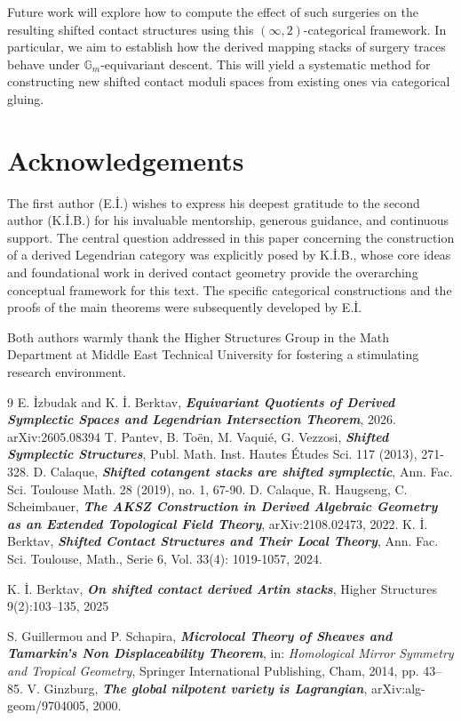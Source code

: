 \documentclass[reqno]{amsart}
\newcommand{\bfem}[1]{\textbf{\textit{#1}}}
\newcommand{\Gm}{\mathbb{G}_m}
\begin{document}
Future work will explore how to compute the effect of such surgeries on the resulting shifted contact structures using this $(\infty, 2)$-categorical framework. In particular, we aim to establish how the derived mapping stacks of surgery traces behave under $\Gm$-equivariant descent. This will yield a systematic method for constructing new shifted contact moduli spaces from existing ones via categorical gluing.

\section*{Acknowledgements}
The first author (E.\.{I}.) wishes to express his deepest gratitude to the second author (K.\.{I}.B.) for his invaluable mentorship, generous guidance, and continuous support. The central question addressed in this paper concerning the construction of a derived Legendrian category was explicitly posed by K.\.{I}.B., whose core ideas and foundational work in derived contact geometry provide the overarching conceptual framework for this text. The specific categorical constructions and the proofs of the main theorems were subsequently developed by E.\.{I}. 

Both authors warmly thank the Higher Structures Group in the Math  Department at Middle East Technical University for fostering a stimulating research environment.

\begin{thebibliography}{9}
 E. \.{I}zbudak and K. \.{I}. Berktav, \bfem{Equivariant Quotients of Derived Symplectic Spaces and Legendrian Intersection Theorem}, 2026.      arXiv:2605.08394
 T. Pantev, B. To\"{e}n, M. Vaqui\'{e}, G. Vezzosi, \bfem{Shifted Symplectic Structures}, Publ. Math. Inst. Hautes \'{E}tudes Sci. 117 (2013), 271-328.
 D. Calaque, \bfem{Shifted cotangent stacks are shifted symplectic}, Ann. Fac. Sci. Toulouse Math. 28 (2019), no. 1, 67-90.
 D. Calaque, R. Haugseng, C. Scheimbauer, \bfem{The AKSZ Construction in Derived Algebraic Geometry as an Extended Topological Field Theory}, arXiv:2108.02473, 2022.
  K. \.{I}. Berktav,
  \bfem{Shifted Contact Structures and Their Local Theory}, Ann. Fac.
  Sci. Toulouse, Math., Serie 6, Vol. 33(4): 1019-1057, 2024.

  K. \.{I}. Berktav,
  \bfem{On shifted contact derived Artin stacks},
  Higher Structures 9(2):103--135, 2025

S. Guillermou and P. Schapira, \bfem{Microlocal Theory of Sheaves and
Tamarkin's Non Displaceability Theorem}, in: \textit{Homological Mirror
Symmetry and Tropical Geometry}, Springer International Publishing,
Cham, 2014, pp. 43--85.
V. Ginzburg, \bfem{The global nilpotent variety is Lagrangian},
arXiv:alg-geom/9704005, 2000.
\end{thebibliography}
\end{document}
